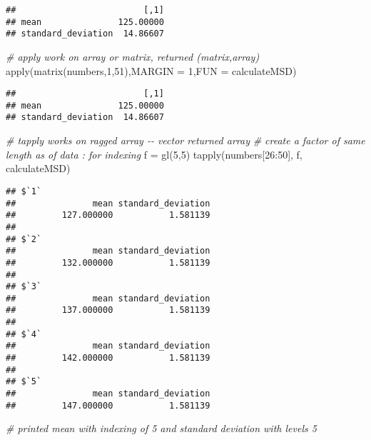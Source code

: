 \documentclass[
]{article}
\newenvironment{Shaded}{\begin{snugshade}}{\end{snugshade}}
\newcommand{\AttributeTok}[1]{\textcolor[rgb]{0.77,0.63,0.00}{#1}}
\newcommand{\CommentTok}[1]{\textcolor[rgb]{0.56,0.35,0.01}{\textit{#1}}}
\newcommand{\DecValTok}[1]{\textcolor[rgb]{0.00,0.00,0.81}{#1}}
\newcommand{\FunctionTok}[1]{\textcolor[rgb]{0.00,0.00,0.00}{#1}}
\newcommand{\NormalTok}[1]{#1}
\newcommand{\OtherTok}[1]{\textcolor[rgb]{0.56,0.35,0.01}{#1}}
\newcommand{\SpecialCharTok}[1]{\textcolor[rgb]{0.00,0.00,0.00}{#1}}
\begin{document}
\begin{verbatim}
##                         [,1]
## mean               125.00000
## standard_deviation  14.86607
\end{verbatim}

\begin{Shaded}
\begin{Highlighting}[]
\CommentTok{\# apply work on array or matrix, returned (matrix,array)}
\FunctionTok{apply}\NormalTok{(}\FunctionTok{matrix}\NormalTok{(numbers,}\DecValTok{1}\NormalTok{,}\DecValTok{51}\NormalTok{),}\AttributeTok{MARGIN =}  \DecValTok{1}\NormalTok{,}\AttributeTok{FUN =}\NormalTok{ calculateMSD)}
\end{Highlighting}
\end{Shaded}

\begin{verbatim}
##                         [,1]
## mean               125.00000
## standard_deviation  14.86607
\end{verbatim}

\begin{Shaded}
\begin{Highlighting}[]
\CommentTok{\# tapply works on ragged array {-}{-} vector returned array}
\CommentTok{\# create a factor of same length as of data : for indexing}
\NormalTok{f }\OtherTok{=} \FunctionTok{gl}\NormalTok{(}\DecValTok{5}\NormalTok{,}\DecValTok{5}\NormalTok{)}
\FunctionTok{tapply}\NormalTok{(numbers[}\DecValTok{26}\SpecialCharTok{:}\DecValTok{50}\NormalTok{], f, calculateMSD)}
\end{Highlighting}
\end{Shaded}

\begin{verbatim}
## $`1`
##               mean standard_deviation 
##         127.000000           1.581139 
## 
## $`2`
##               mean standard_deviation 
##         132.000000           1.581139 
## 
## $`3`
##               mean standard_deviation 
##         137.000000           1.581139 
## 
## $`4`
##               mean standard_deviation 
##         142.000000           1.581139 
## 
## $`5`
##               mean standard_deviation 
##         147.000000           1.581139
\end{verbatim}

\begin{Shaded}
\begin{Highlighting}[]
\CommentTok{\# printed mean with indexing of 5 and standard deviation with levels 5}
\end{Highlighting}
\end{Shaded}
\end{document}
